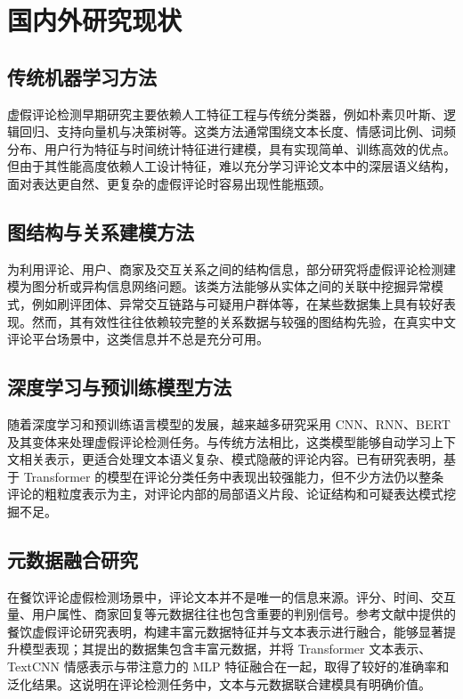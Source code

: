 \documentclass[UTF8,oneside,openright,fontset=none]{ctexbook}
\numberwithin{equation}{chapter}
\begin{document}
\section{国内外研究现状}
\subsection{传统机器学习方法}
虚假评论检测早期研究主要依赖人工特征工程与传统分类器，例如朴素贝叶斯、逻辑回归、支持向量机与决策树等。这类方法通常围绕文本长度、情感词比例、词频分布、用户行为特征与时间统计特征进行建模，具有实现简单、训练高效的优点。但由于其性能高度依赖人工设计特征，难以充分学习评论文本中的深层语义结构，面对表达更自然、更复杂的虚假评论时容易出现性能瓶颈。

\subsection{图结构与关系建模方法}
为利用评论、用户、商家及交互关系之间的结构信息，部分研究将虚假评论检测建模为图分析或异构信息网络问题。该类方法能够从实体之间的关联中挖掘异常模式，例如刷评团体、异常交互链路与可疑用户群体等，在某些数据集上具有较好表现。然而，其有效性往往依赖较完整的关系数据与较强的图结构先验，在真实中文评论平台场景中，这类信息并不总是充分可用。

\subsection{深度学习与预训练模型方法}
随着深度学习和预训练语言模型的发展，越来越多研究采用 CNN、RNN、BERT 及其变体来处理虚假评论检测任务。与传统方法相比，这类模型能够自动学习上下文相关表示，更适合处理文本语义复杂、模式隐蔽的评论内容。已有研究表明，基于 Transformer 的模型在评论分类任务中表现出较强能力，但不少方法仍以整条评论的粗粒度表示为主，对评论内部的局部语义片段、论证结构和可疑表达模式挖掘不足。

\subsection{元数据融合研究}
在餐饮评论虚假检测场景中，评论文本并不是唯一的信息来源。评分、时间、交互量、用户属性、商家回复等元数据往往也包含重要的判别信号。参考文献中提供的餐饮虚假评论研究表明，构建丰富元数据特征并与文本表示进行融合，能够显著提升模型表现；其提出的数据集包含丰富元数据，并将 Transformer 文本表示、TextCNN 情感表示与带注意力的 MLP 特征融合在一起，取得了较好的准确率和泛化结果。这说明在评论检测任务中，文本与元数据联合建模具有明确价值。
\end{document}
